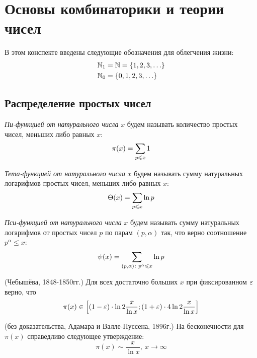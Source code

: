 \section{Основы комбинаторики и теории чисел}

\begin{anote}
	В этом конспекте введены следующие обозначения для облегчения жизни:
	\begin{align*}
		&{\mathbb{N}_1 = \mathbb{N} = \{1, 2, 3, \ldots\}}
		\\
		&{\mathbb{N}_0 = \{0, 1, 2, 3, \ldots\}}
	\end{align*}
\end{anote}

\subsection{Распределение простых чисел}

\begin{definition}
	\textit{Пи-функцией от натурального числа } $x$ будем называть количество простых чисел, меньших либо равных $x$:
	\[
		\pi(x) = \sum\limits_{p \leqslant x} 1
	\]
\end{definition}

\begin{definition}
	\textit{Тета-функцией от натурального числа} $x$ будем называть сумму натуральных логарифмов простых чисел, меньших либо равных $x$:
	\[
		\Theta(x) = \sum\limits_{p \leqslant x} \ln p
	\]
\end{definition}

\begin{definition}
	\textit{Пси-функцией от натурального числа} $x$ будем называть сумму натуральных логарифмов от простых чисел $p$ по парам $(p, \alpha)$ так, что верно соотношение $p^\alpha \le x$:
	\[
		\psi(x) = \sum\limits_{(p, \alpha) \colon p^\alpha \leqslant x} \ln p
	\]
\end{definition}

\begin{theorem} (Чебышёва, 1848-1850гг.)
	Для всех достаточно больших $x$ при фиксированном $\varepsilon$ верно, что
	\[
		\pi(x) \in \left[(1 - \varepsilon) \cdot \ln 2 \frac{x}{\ln x}; (1 + \varepsilon) \cdot 4\ln 2 \frac{x}{\ln x}\right]
	\]
\end{theorem}

\begin{theorem} (без доказательства, Адамара и Валле-Пуссена, 1896г.)
	На бесконечности для $\pi(x)$ справедливо следующее утверждение:
	\[
		\pi(x) \sim \frac{x}{\ln x},\ x \to \infty
	\]
\end{theorem}


